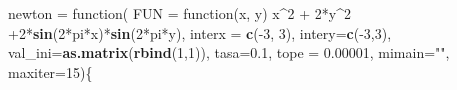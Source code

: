 \documentclass[]{article}
\newenvironment{Shaded}{\begin{snugshade}}{\end{snugshade}}
\newcommand{\KeywordTok}[1]{\textcolor[rgb]{0.13,0.29,0.53}{\textbf{{#1}}}}
\newcommand{\DataTypeTok}[1]{\textcolor[rgb]{0.13,0.29,0.53}{{#1}}}
\newcommand{\DecValTok}[1]{\textcolor[rgb]{0.00,0.00,0.81}{{#1}}}
\newcommand{\FloatTok}[1]{\textcolor[rgb]{0.00,0.00,0.81}{{#1}}}
\newcommand{\StringTok}[1]{\textcolor[rgb]{0.31,0.60,0.02}{{#1}}}
\newcommand{\NormalTok}[1]{{#1}}
\begin{document}
\begin{Shaded}
\begin{Highlighting}[]
\NormalTok{newton =}\StringTok{ }\NormalTok{function(}
  \DataTypeTok{FUN =} \NormalTok{function(x, y) x^}\DecValTok{2} \NormalTok{+}\StringTok{  }\DecValTok{2}\NormalTok{*y^}\DecValTok{2} \NormalTok{+}\DecValTok{2}\NormalTok{*}\KeywordTok{sin}\NormalTok{(}\DecValTok{2}\NormalTok{*pi*x)*}\KeywordTok{sin}\NormalTok{(}\DecValTok{2}\NormalTok{*pi*y), }\DataTypeTok{interx =} \KeywordTok{c}\NormalTok{(-}\DecValTok{3}\NormalTok{, }\DecValTok{3}\NormalTok{), }\DataTypeTok{intery=}\KeywordTok{c}\NormalTok{(-}\DecValTok{3}\NormalTok{,}\DecValTok{3}\NormalTok{),}
  \DataTypeTok{val_ini=}\KeywordTok{as.matrix}\NormalTok{(}\KeywordTok{rbind}\NormalTok{(}\DecValTok{1}\NormalTok{,}\DecValTok{1}\NormalTok{)), }\DataTypeTok{tasa=}\FloatTok{0.1}\NormalTok{, }\DataTypeTok{tope =} \FloatTok{0.00001}\NormalTok{, }\DataTypeTok{mimain=}\StringTok{""}\NormalTok{, }\DataTypeTok{maxiter=}\DecValTok{15}\NormalTok{)\{}


\end{Highlighting}
\end{Shaded}
\end{document}
